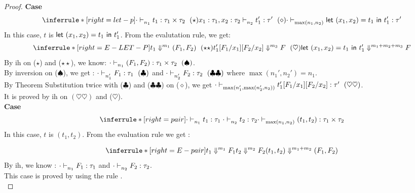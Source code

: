 \documentclass{article}
\begin{document}
\begin{proof}
 \noindent \textbf{Case}
 \[
 \inferrule*[ right = let-p ]
   {\cdot \jtype{n_1}{}{t_1}{\tau_1 \times \tau_2 }~(\star) \\  x_1: \tau_1, x_2 : \tau_2 \jtype{n_2}{}{t_1'}{\tau'}~(\diamond) }
   { \cdot  \jtype{\max(n_1,n_2)}{}{ \letx{(x_1,x_2)}{t_1}{t_1'} }{\tau'}  }
 \]
 In this case, $t$ is $ \mathrel{ \mathsf{let}\ {(x_1,x_2)} = {t_1} \ \mathsf{in} \ {t_1'} } $.
 From the evalutation rule, we get:
 \[
 \inferrule*[ right=E-LET-P]
  {   
    { \eval{ t_1  }{ (F_1,F_2)  }{m_1}~(\star\star) } 
    \\
    { \eval{t_1'[F_1/x_1][F_2/x_2] }{ F}{m_3 }~(\heartsuit) }
  }
  { \eval{  \letx{(x_1,x_2)}{t_1}{t_1'}  }{ F  }{ m_1+m_2+m_3  } }
  \]
 By ih on ($\star$) and ($\star\star$), we know: $ \cdot \mathrel{\vdash_{n_1}^{} {(F_1,F_2)} : {\tau_1 \times \tau_2}}~(\spadesuit) $. \\
 By inversion on ($\spadesuit$), we get : $\cdot \mathrel{\vdash_{n_1'}^{} {F_1} : {\tau_1}} ~(\clubsuit)$ and $\cdot \mathrel{\vdash_{n_2'}^{} {F_2} : {\tau_2}} ~(\clubsuit\clubsuit)$ where $\max(n_1',n_2') = n_1$.\\
 By Theorem Substitution twice with ($\clubsuit$) and ($\clubsuit\clubsuit$) on ($\diamond$), we get $\cdot \mathrel{\vdash_{\max(n_1',\max(n_2',n_2))}^{} {t_1'[F_1/x_1][F_2/x_2]} : {\tau'}} ~(\heartsuit\heartsuit)$.\\
 It is proved by ih on $(\heartsuit\heartsuit)$ and ($\heartsuit$).\\
 
 \noindent \textbf{Case}
 \[
     \inferrule*[right = pair]
   {\cdot \jtype{n_1}{}{t_1}{\tau_1} \\ \cdot \jtype{n_2}{}{t_2}{\tau_2}}
   { \cdot  \jtype{\max(n_1,n_2)}{}{(t_1, t_2)}{\tau_1 \times \tau_2}  }\]
   In this case, $t$ is $(t_1,t_2)$. From the evaluation rule we get :
   
   \[  
   \inferrule*[ right=E-pair]
  {   
    { \eval{ t_1  }{ F_1  }{m_1} }
    \\
    { \eval{ t_2  }{ F_2  }{m_2} } 
  }
  { \eval{  (t_1,t_2)  }{ (F_1,F_2)  }{ m_1+m_2  } } 
  \]
  By ih, we know : $ \cdot \mathrel{\vdash_{n_1}^{} {F_1} : {\tau_1}}$ and $ \cdot \mathrel{\vdash_{n_2}^{} {F_2} : {\tau_2}}$. \\
  This case is proved by using the rule .\\
   
 
\end{proof}
\end{document}
